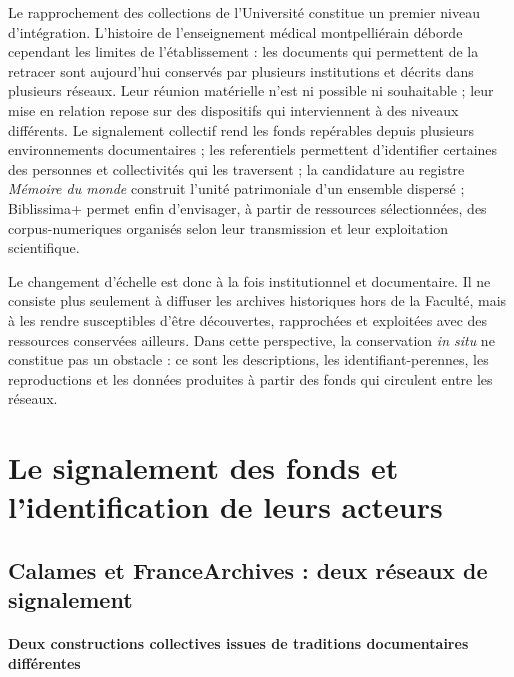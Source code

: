 
Le rapprochement des collections de l'Université constitue un premier niveau d'intégration. L'histoire de l'enseignement médical montpelliérain déborde cependant les limites de l'établissement : les documents qui permettent de la retracer sont aujourd'hui conservés par plusieurs institutions et décrits dans plusieurs réseaux. Leur réunion matérielle n'est ni possible ni souhaitable ; leur mise en relation repose sur des dispositifs qui interviennent à des niveaux différents. Le \gls{signalement} collectif rend les fonds repérables depuis plusieurs environnements documentaires ; les \glspl{referentiel} permettent d'identifier certaines des personnes et collectivités qui les traversent ; la candidature au registre \emph{Mémoire du monde} construit l'unité patrimoniale d'un ensemble dispersé ; Biblissima+ permet enfin d'envisager, à partir de ressources sélectionnées, des \glspl{corpus-numerique} organisés selon leur transmission et leur exploitation scientifique.

Le changement d'échelle est donc à la fois institutionnel et documentaire. Il ne consiste plus seulement à diffuser les archives historiques hors de la Faculté, mais à les rendre susceptibles d'être découvertes, rapprochées et exploitées avec des ressources conservées ailleurs. Dans cette perspective, la conservation \emph{in situ} ne constitue pas un obstacle : ce sont les descriptions, les \glspl{identifiant-perenne}, les reproductions et les données produites à partir des fonds qui circulent entre les réseaux.



\section{Le \gls{signalement} des fonds et l'identification de leurs acteurs}

\subsection{Calames et FranceArchives : deux réseaux de \gls{signalement}}

\paragraph{Deux constructions collectives issues de traditions documentaires différentes}

